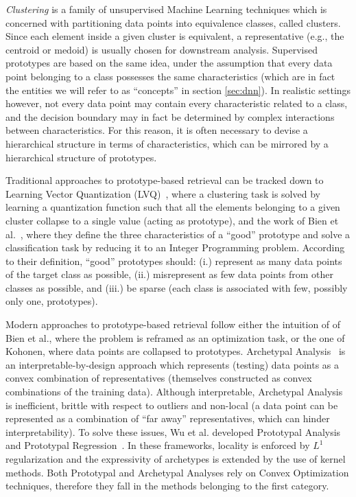 \textit{Clustering} is a family of unsupervised Machine Learning techniques which is concerned with partitioning data points into equivalence classes, called clusters. Since each element inside a given cluster is equivalent, a representative (e.g., the centroid or medoid) is usually chosen for downstream analysis.
Supervised prototypes are based on the same idea, under the assumption that every data point belonging to a class possesses the same characteristics (which are in fact the entities we will refer to as ``concepts'' in section \ref{sec:dnn}). In realistic settings however, not every data point may contain every characteristic related to a class, and the decision boundary may in fact be determined by complex interactions between characteristics. For this reason, it is often necessary to devise a hierarchical structure in terms of characteristics, which can be mirrored by a hierarchical structure of prototypes.

Traditional approaches to prototype-based retrieval can be tracked down to Learning Vector Quantization (LVQ)~\cite{kohonen1995learning}, where a clustering task is solved by learning a quantization function such that all the elements belonging to a given cluster collapse to a single value (acting as prototype), and the work of Bien et al.~\cite{bien2011prototype}, where they define the three characteristics of a ``good'' prototype and solve a classification task by reducing it to an Integer Programming problem. According to their definition, ``good'' prototypes should: (i.) represent as many data points of the target class as possible, (ii.) misrepresent as few data points from other classes as possible, and (iii.) be sparse (each class is associated with few, possibly only one, prototypes).

Modern approaches to prototype-based retrieval follow either the intuition of of Bien et al., where the problem is reframed as an optimization task, or the one of Kohonen, where data points are collapsed to prototypes.
%
Archetypal Analysis~\cite{cutler1994archetypal} is an interpretable-by-design approach which represents (testing) data points as a convex combination of representatives (themselves constructed as convex combinations of the training data). Although interpretable, Archetypal Analysis is inefficient, brittle with respect to outliers and non-local (a data point can be represented as a combination of ``far away'' representatives, which can hinder interpretability). To solve these issues, Wu et al. developed Prototypal Analysis and Prototypal Regression~\cite{wu2017prototypal}.
In these frameworks, locality is enforced by $L^1$ regularization and the expressivity of archetypes is extended by the use of kernel methods.
Both Prototypal and Archetypal Analyses rely on Convex Optimization techniques, therefore they fall in the methods belonging to the first category.

